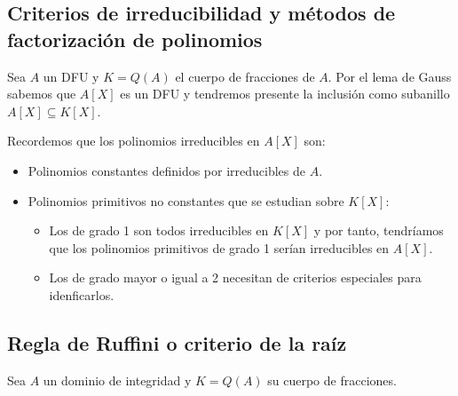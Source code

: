 \subsection{Criterios de irreducibilidad y métodos de factorización de polinomios}

Sea $A$ un DFU y $K = Q(A)$ el cuerpo de fracciones de $A$. Por el lema de Gauss sabemos que $A[X]$ es un DFU y tendremos presente la inclusión como subanillo $A[X] \subseteq K[X]$. 

Recordemos que los polinomios irreducibles en $A[X]$ son:

\begin{itemize}
\item Polinomios constantes definidos por irreducibles de $A$.

\item Polinomios primitivos no constantes que se estudian sobre $K[X]$:

\begin{itemize}
\item Los de grado 1 son todos irreducibles en $K[X]$ y por tanto, tendríamos que los polinomios primitivos de grado 1 serían irreducibles en $A[X]$. 
\item Los de grado mayor o igual a 2 necesitan de criterios especiales para idenficarlos. 
\end{itemize}
\end{itemize}

\subsection{Regla de Ruffini o criterio de la raíz}

Sea $A$ un dominio de integridad y $K = Q(A)$ su cuerpo de fracciones.

